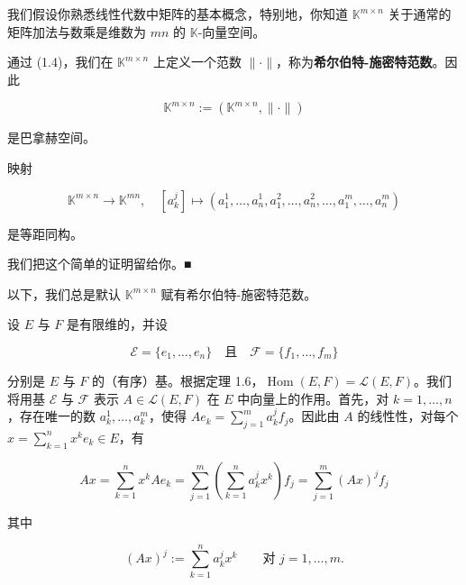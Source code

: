 我们假设你熟悉线性代数中矩阵的基本概念，特别地，你知道 $ \mathbb{K}^{m \times n} $ 关于通常的矩阵加法与数乘是维数为 $ mn $ 的 $ \mathbb{K} $-向量空间。

\begin{proposition}

\begin{subitems}
\item

通过 (1.4)，我们在 $ \mathbb{K}^{m \times n} $ 上定义一个范数 $ \|\cdot\| $，称为\textbf{希尔伯特-施密特范数}。因此

\[
\mathbb{K}^{m \times n} := (\mathbb{K}^{m \times n}, \|\cdot\|)
\]

是巴拿赫空间。

\item

映射

\[
\mathbb{K}^{m \times n} \to \mathbb{K}^{mn} , \quad [a_{k}^{j}] \mapsto (a_{1}^{1}, \ldots, a_{n}^{1}, a_{1}^{2}, \ldots, a_{n}^{2}, \ldots, a_{1}^{m}, \ldots, a_{n}^{m})
\]

是等距同构。

\proofhead
我们把这个简单的证明留给你。\nobreak\hspace{0.35em}■
\end{subitems}

\end{proposition}

以下，我们总是默认 $ \mathbb{K}^{m \times n} $ 赋有希尔伯特-施密特范数。

设 $ E $ 与 $ F $ 是有限维的，并设

\[
\mathcal{E} = \{e_{1}, \ldots, e_{n}\} \quad \text{且} \quad \mathcal{F} = \{f_{1}, \ldots, f_{m}\}
\]

分别是 $ E $ 与 $ F $ 的（有序）基。根据定理 1.6，$ \operatorname{Hom}(E, F) = \mathcal{L}(E, F) $。我们将用基 $ \mathcal{E} $ 与 $ \mathcal{F} $ 表示 $ A \in \mathcal{L}(E, F) $ 在 $ E $ 中向量上的作用。首先，对 $ k = 1, \ldots, n $，存在唯一的数 $ a_{k}^{1}, \ldots, a_{k}^{m} $，使得 $ Ae_{k} = \sum_{j=1}^{m} a_{k}^{j}f_{j} $。因此由 $ A $ 的线性性，对每个 $ x = \sum_{k=1}^{n} x^{k}e_{k} \in E $，有

\[
Ax = \sum_{k=1}^{n} x^{k}Ae_{k} = \sum_{j=1}^{m}\left( \sum_{k=1}^{n} a_{k}^{j}x^{k} \right)f_{j} = \sum_{j=1}^{m}(Ax)^{j}f_{j}
\]

其中

\[
(Ax)^{j} := \sum_{k=1}^{n} a_{k}^{j}x^{k} \qquad \text{对 } j = 1, \ldots, m .
\]

